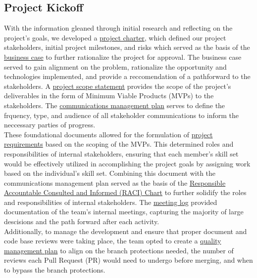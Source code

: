 \documentclass[english,course]{lecture}
\begin{document}
\subsection{Project Kickoff}
With the information gleaned through initial research and reflecting on the project's goals, we developed a \href{https://github.com/teamcrusher/threewide/blob/main/PM%20documentation/Project%20charter.md}{project charter},
which defined our project stakeholders, initial project milestones, and risks which served as the basis of the \href{https://github.com/teamcrusher/threewide/blob/main/PM%20documentation/Business%20case%20doc.md}{business case}
to further rationalize the project for approval. The business case served to gain alignment on the problem, rationalize the opportunity and technologies implemented, and provide a reccomendation of a pathforward to the stakeholders. A \href{https://github.com/teamcrusher/threewide/blob/main/PM%20documentation/Project%20Scope%20Statement.md}{project scope statement}
provides the scope of the project's deliverables in the form of Minimum Viable Products (MVPs) to the stakeholders. The \href{https://github.com/teamcrusher/threewide/blob/main/PM%20documentation/Communication%20Management%20Plan.md}{communications management plan}
serves to define the frquency, type, and audience of all stakeholder communications to inform the neccessary parties of progress.
%
\\These foundational documents allowed for the formulation of \href{https://github.com/teamcrusher/threewide/blob/main/PM%20documentation/Project%20Requirements%20Document.md}{project requirements}
based on the scoping of the MVPs. This determined roles and responsibilities of internal stakeholders, ensuring that each member's skill set would be effectively utilized in accomplishing the project goals by assigning work based on the individual's skill set. Combining this document with the communications management plan served as the basis of the \href{https://github.com/teamcrusher/threewide/blob/main/PM%20documentation/RACI%20Chart.md}{Responsible Accountable Consulted and Informed (RACI) Chart}
to further solidify the roles and responsibilities of internal stakeholders. The \href{https://github.com/teamcrusher/threewide/blob/main/PM%20documentation/Meeting%20Log.md}{meeting log}
provided documentation of the team's internal meetings, capturing the majority of large descisions and the path forward after each activity.
%
\\Additionally, to manage the development and ensure that proper document and code base reviews were taking place, the team opted to create a \href{https://github.com/teamcrusher/threewide/blob/main/PM%20documentation/Quality%20Management%20Plan.md}{quality management plan}
to align on the branch protections needed, the number of reviews each Pull Request (PR) would need to undergo before merging, and when to bypass the branch protections.
%
\end{document}
